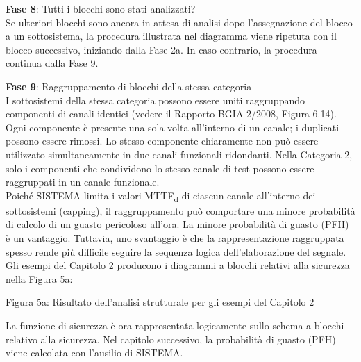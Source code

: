 \documentclass[a4paper,11pt]{article}
\begin{document}
    \par\medskip\noindent \textbf{Fase 8}: Tutti i blocchi sono stati analizzati?\\
    Se ulteriori blocchi sono ancora in attesa di analisi dopo l'assegnazione del blocco a un sottosistema, la procedura illustrata nel diagramma viene ripetuta con il blocco successivo, iniziando dalla Fase 2a. In caso contrario, la procedura continua dalla Fase 9.
    
    \par\medskip\noindent \textbf{Fase 9}: Raggruppamento di blocchi della stessa categoria\\
    I sottosistemi della stessa categoria possono essere uniti raggruppando componenti di canali identici (vedere il Rapporto BGIA 2/2008, Figura 6.14). Ogni componente è presente una sola volta all'interno di un canale; i duplicati possono essere rimossi. Lo stesso componente chiaramente non può essere utilizzato simultaneamente in due canali funzionali ridondanti. Nella Categoria 2, solo i componenti che condividono lo stesso canale di test possono essere raggruppati in un canale funzionale.\\
    Poiché SISTEMA limita i valori MTTF\textsubscript{d} di ciascun canale all'interno dei sottosistemi (capping), il raggruppamento può comportare una minore probabilità di calcolo di un guasto pericoloso all'ora. La minore probabilità di guasto (PFH) è un vantaggio. Tuttavia, uno svantaggio è che la rappresentazione raggruppata spesso rende più difficile seguire la sequenza logica dell'elaborazione del segnale.\\
    Gli esempi del Capitolo 2 producono i diagrammi a blocchi relativi alla sicurezza nella Figura 5a:
    
    Figura 5a: Risultato dell'analisi strutturale per gli esempi del Capitolo 2

    La funzione di sicurezza è ora rappresentata logicamente sullo schema a blocchi relativo alla sicurezza. Nel capitolo successivo, la probabilità di guasto (PFH) viene calcolata con l'ausilio di SISTEMA.
    \clearpage
\end{document}
